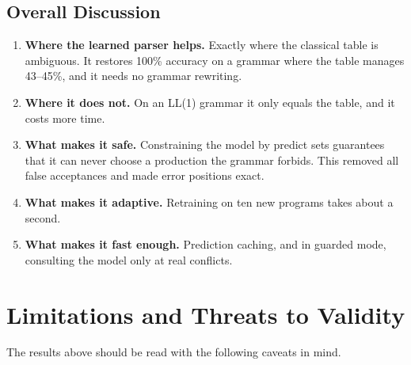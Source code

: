 \documentclass[12pt,a4paper]{article}
\begin{document}
\subsection{Overall Discussion}

\begin{enumerate}
    \item \textbf{Where the learned parser helps.} Exactly where the classical
    table is ambiguous. It restores 100\% accuracy on a grammar where the table
    manages 43--45\%, and it needs no grammar rewriting.
    \item \textbf{Where it does not.} On an LL(1) grammar it only equals the
    table, and it costs more time.
    \item \textbf{What makes it safe.} Constraining the model by predict sets
    guarantees that it can never choose a production the grammar forbids. This
    removed all false acceptances and made error positions exact.
    \item \textbf{What makes it adaptive.} Retraining on ten new programs
    takes about a second.
    \item \textbf{What makes it fast enough.} Prediction caching, and in
    guarded mode, consulting the model only at real conflicts.
\end{enumerate}

\newpage
\section{Limitations and Threats to Validity}

The results above should be read with the following caveats in mind.
\end{document}
